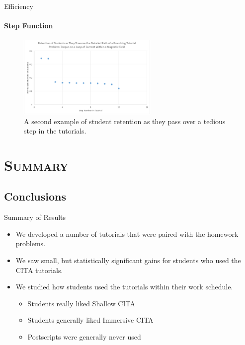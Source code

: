 \documentclass[xcolor=x11names,compress]{beamer}
\begin{document}
\begin{frame}{Efficiency}
	\framesubtitle{Step Function}
	\begin{figure}
		\centering
		\includegraphics[width=0.6\textwidth]{img/step_function_2.png}
		\caption{A second example of student retention as they pass over a tedious step in the tutorials.}
		\label{fig:step_function_examples}
	\end{figure}	
\end{frame}


\section{\scshape Summary}

\subsection{Conclusions}

\begin{frame}{Summary of Results}
	\begin{itemize}
		\item We developed a number of tutorials that were paired with the homework problems.
		\item We saw small, but statistically significant gains for students who used the CITA tutorials.
		\item We studied how students used the tutorials within their work schedule.
		\begin{itemize}
			\item Students really liked Shallow CITA
			\item Students generally liked Immersive CITA
			\item Postscripts were generally never used
		\end{itemize}
	\end{itemize}
\end{frame}
\end{document}
